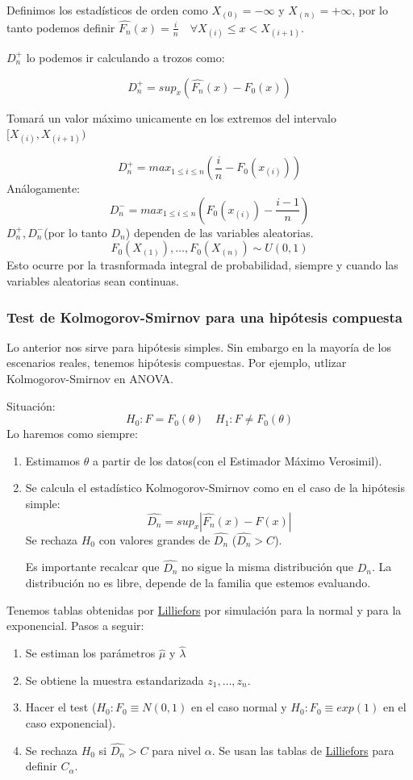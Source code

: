 Definimos los estadísticos de orden como $X_{(0)}=-\infty$ y $X_{(n)}=+\infty$, por lo tanto podemos definir $\widehat{F_n}(x)=\frac{i}{n} \quad \forall X_{(i)} \leq x < X_{(i+1)}$.

$D_n^+$ lo podemos ir calculando a trozos como:

\[
    D_n^+=sup_x(\widehat{F_n}(x)-F_0(x))
\]
    
Tomará un valor máximo unicamente en los extremos del intervalo $[X_{(i)},X_{(i+1)})$        
            
\[
    D_n^+=max_{1 \leq i \leq n}\left(\frac{i}{n}-F_0(x_{(i)})\right)
\]
Análogamente:
\[
    D_n^-=max_{1 \leq i \leq n}\left(F_0(x_{(i)})-\frac{i-1}{n}\right)
\]
$D_n^+,D_n^-$(por lo tanto $D_n$) dependen de las variables aleatorias.
\[
F_0(X_{(1)}),\dots,F_0(X_{(n)}) \sim U(0,1)
\]
Esto ocurre por la trasnformada integral de probabilidad, siempre y cuando las variables aleatorias sean continuas.

\subsubsection{Test de Kolmogorov-Smirnov para una hipótesis compuesta}

Lo anterior nos sirve para hipótesis simples. Sin embargo en la mayoría de los escenarios reales, tenemos hipótesis compuestas.
Por ejemplo, utlizar Kolmogorov-Smirnov en ANOVA.

Situación:
\[
H_0: F=F_0(\theta) \quad H_1:F \neq F_0(\theta)
\]
Lo haremos como siempre:
\begin{enumerate}
    \item Estimamos $\theta$ a partir de los datos(con el Estimador Máximo Verosimil).
    \item Se calcula el estadístico Kolmogorov-Smirnov como en el caso de la hipótesis simple:
    \[
        \widehat{D_n}=sup_x|\widehat{F_n}(x)-F(x)|
    \]
    Se rechaza $H_0$ con valores grandes de $\widehat{D_n}$ ($\widehat{D_n}>C$). 
    
    Es importante recalcar que $\widehat{D_n}$ no sigue la misma distribución que $D_n$.
    La distribución no es libre, depende de la familia que estemos evaluando.
\end{enumerate}

Tenemos tablas obtenidas por \href{https://es.wikipedia.org/wiki/Prueba_de_Lilliefors}{Lilliefors}
por simulación para la normal y para la exponencial.
Pasos a seguir:
\begin{enumerate}
    \item Se estiman los parámetros $\hat{\mu}$ y $\widehat{\lambda}$
    \item Se obtiene la muestra estandarizada $z_1,\dots,z_n$.
    \item Hacer el test ($H_0:F_0 \equiv N(0,1)$ en el caso normal y $H_0:F_0\equiv exp(1)$ en el caso exponencial).
    \item Se rechaza $H_0$ si $\widehat{D_n}>C$ para nivel $\alpha$. Se usan las tablas de \href{https://es.wikipedia.org/wiki/Prueba_de_Lilliefors}{Lilliefors}
    para definir $C_\alpha$.
\end{enumerate}

